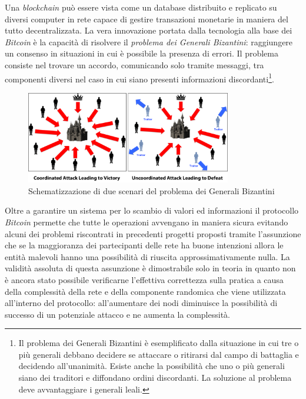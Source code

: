 Una \textit{blockchain} può essere vista come un database distribuito e replicato su diversi computer in rete capace di gestire transazioni monetarie in maniera del tutto decentralizzata.\newline\newline
La vera innovazione portata dalla tecnologia alla base dei \textit{Bitcoin} è la capacità di risolvere il \textit{problema dei Generali Bizantini}: raggiungere un consenso in situazioni in cui è possibile la presenza di errori.\newline
Il problema consiste nel trovare un accordo, comunicando solo tramite messaggi, tra componenti diversi nel caso in cui siano presenti informazioni discordanti\footnote{Il problema dei Generali Bizantini è esemplificato dalla situazione in cui tre o più generali debbano decidere se attaccare o ritirarsi dal campo di battaglia e decidendo all'unanimità. Esiste anche la possibilità che uno o più generali siano dei traditori e diffondano ordini discordanti. La soluzione al problema deve avvantaggiare i generali leali.}.\newline
\begin{figure}
    \centering
    \includegraphics[width=0.8\textwidth]{images/byzantine.png}
    \caption{Schematizzazione di due scenari del problema dei Generali Bizantini}
\end{figure}
Oltre a garantire un sistema per lo scambio di valori ed informazioni il protocollo \textit{Bitcoin} permette che tutte le operazioni avvengano in maniera sicura evitando alcuni dei problemi riscontrati in precedenti progetti proposti tramite l'assunzione che se la maggioranza dei partecipanti delle rete ha buone intenzioni allora le entità malevoli hanno una possibilità di riuscita approssimativamente nulla.\newline
La validità assoluta di questa assunzione è dimostrabile solo in teoria in quanto non è ancora stato possibile verificarne l'effettiva correttezza sulla pratica a causa della complessità della rete e della componente randomica che viene utilizzata all'interno del protocollo: all'aumentare dei nodi diminuisce la possibilità di successo di un potenziale attacco e ne aumenta la complessità.\newline

